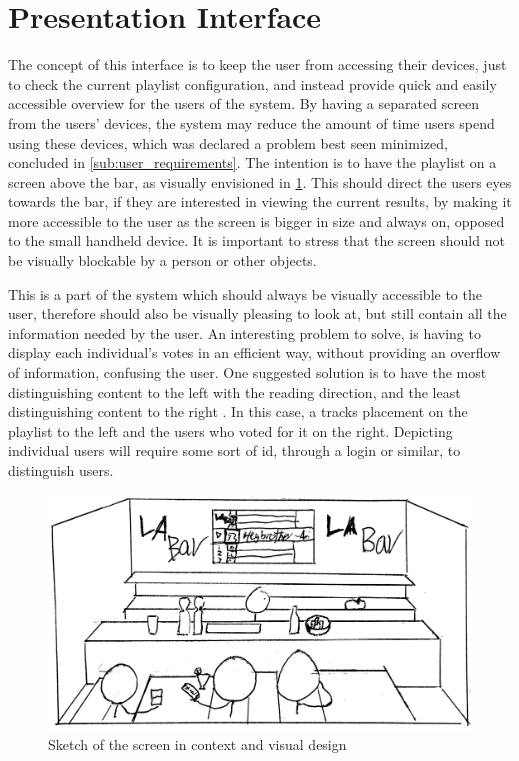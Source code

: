 \section{Presentation Interface}

The concept of this interface is to keep the user from accessing their devices, just to check the current playlist configuration, and instead provide quick and easily accessible overview for the users of the system. By having a separated screen from the users' devices, the system may reduce the amount of time users spend using these devices, which was declared a problem best seen minimized, concluded in \cref{sub:user_requirements}. The intention is to have the playlist on a screen above the bar, as visually envisioned in \cref{fig:PresentationInterface}. This should direct the users eyes towards the bar, if they are interested in viewing the current results, by making it more accessible to the user as the screen is bigger in size and always on, opposed to the small handheld device\cite{DEB}. It is important to stress that the screen should not be visually blockable by a person or other objects.

This is a part of the system which should always be visually accessible to the user, therefore should also be visually pleasing to look at, but still contain all the information needed by the user. An interesting problem to solve, is having to display each individual's votes in an efficient way, without providing an overflow of information, confusing the user. One suggested solution is to have the most distinguishing content to the left with the reading direction, and the least distinguishing content to the right \cite{material}. In this case, a tracks placement on the playlist to the left and the users who voted for it on the right. Depicting individual users will require some sort of id, through a login or similar, to distinguish users.

\begin{figure}[hbtp]
  \centering
  \includegraphics[width=1.0\linewidth]{Images/presentation.png}
  \caption{Sketch of the screen in context and visual design}\label{fig:PresentationInterface}
\end{figure}

